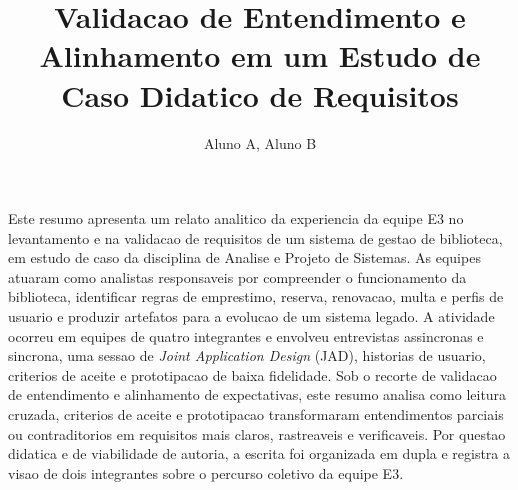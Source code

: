 ﻿\documentclass[12pt]{article}
\title{Validacao de Entendimento e Alinhamento em um Estudo de Caso Didatico de Requisitos}
\author{Aluno A\inst{1}, Aluno B\inst{1}}
\begin{document}
\maketitle

%
%
Este resumo apresenta um relato analitico da experiencia da equipe E3 no levantamento e na validacao de requisitos de um sistema de gestao de biblioteca, em estudo de caso da disciplina de Analise e Projeto de Sistemas. As equipes atuaram como analistas responsaveis por compreender o funcionamento da biblioteca, identificar regras de emprestimo, reserva, renovacao, multa e perfis de usuario e produzir artefatos para a evolucao de um sistema legado. A atividade ocorreu em equipes de quatro integrantes e envolveu entrevistas assincronas e sincrona, uma sessao de \textit{Joint Application Design} (JAD), historias de usuario, criterios de aceite e prototipacao de baixa fidelidade. Sob o recorte de validacao de entendimento e alinhamento de expectativas, este resumo analisa como leitura cruzada, criterios de aceite e prototipacao transformaram entendimentos parciais ou contraditorios em requisitos mais claros, rastreaveis e verificaveis. Por questao didatica e de viabilidade de autoria, a escrita foi organizada em dupla e registra a visao de dois integrantes sobre o percurso coletivo da equipe E3.
\end{document}
